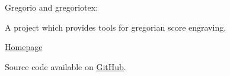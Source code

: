 \documentclass[12pt]{article}
\begin{document}
\begin{titlepage}
  \begin{center}
    \Huge
    \textcolor{myred}{Gregorio} and \textcolor{myred}{gregoriotex}:

    A project which provides tools for gregorian score engraving.

    \vspace{1cm}\large\href{http://home.gna.org/gregorio/}{Homepage}

    Source code available on
    \href{http://github.com/gregorio-project/gregorio}{GitHub}.
  \end{center}
  \vspace{2cm}
  \begin{multicols}{2}
    \tableofcontents
  \end{multicols}
\end{titlepage}


% 
% 
\end{document}
